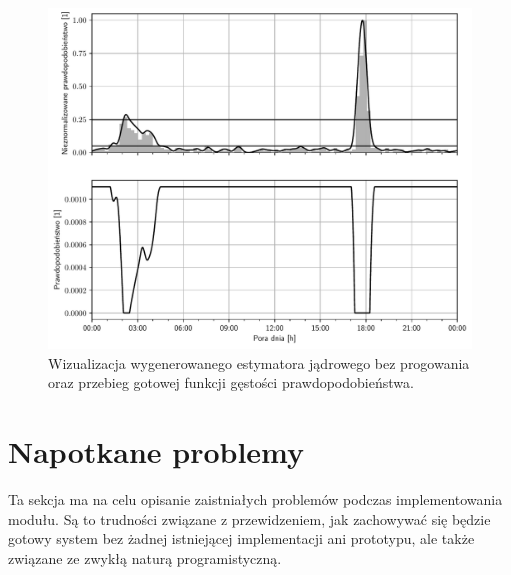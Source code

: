 \begin{figure}[t]
    \centering\includegraphics[width=1.00\textwidth]{img/transformation.pdf}
    \caption{Wizualizacja wygenerowanego estymatora jądrowego bez progowania oraz przebieg gotowej funkcji gęstości prawdopodobieństwa.} \label{fig:transform}
\end{figure}

\section{Napotkane problemy}
Ta sekcja ma na celu opisanie zaistniałych problemów podczas implementowania modułu. Są to trudności związane z przewidzeniem, jak zachowywać się będzie gotowy system bez żadnej istniejącej implementacji ani prototypu, ale także związane ze zwykłą naturą programistyczną.

